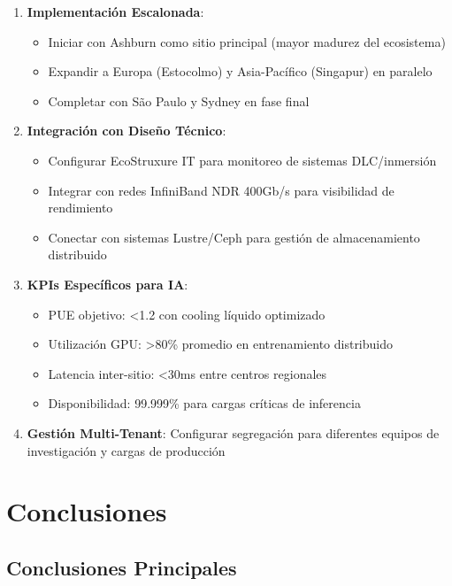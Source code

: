 \documentclass[12pt,a4paper]{article}
\begin{document}
\begin{enumerate}
    \item \textbf{Implementación Escalonada}:
    \begin{itemize}
        \item Iniciar con Ashburn como sitio principal (mayor madurez del ecosistema)
        \item Expandir a Europa (Estocolmo) y Asia-Pacífico (Singapur) en paralelo
        \item Completar con São Paulo y Sydney en fase final
    \end{itemize}

    \item \textbf{Integración con Diseño Técnico}:
    \begin{itemize}
        \item Configurar EcoStruxure IT para monitoreo de sistemas DLC/inmersión
        \item Integrar con redes InfiniBand NDR 400Gb/s para visibilidad de rendimiento
        \item Conectar con sistemas Lustre/Ceph para gestión de almacenamiento distribuido
    \end{itemize}

    \item \textbf{KPIs Específicos para IA}:
    \begin{itemize}
        \item PUE objetivo: <1.2 con cooling líquido optimizado
        \item Utilización GPU: >80\% promedio en entrenamiento distribuido
        \item Latencia inter-sitio: <30ms entre centros regionales
        \item Disponibilidad: 99.999\% para cargas críticas de inferencia
    \end{itemize}

    \item \textbf{Gestión Multi-Tenant}: Configurar segregación para diferentes equipos de investigación y cargas de producción
\end{enumerate}

\section{Conclusiones}

\subsection{Conclusiones Principales}
\end{document}
